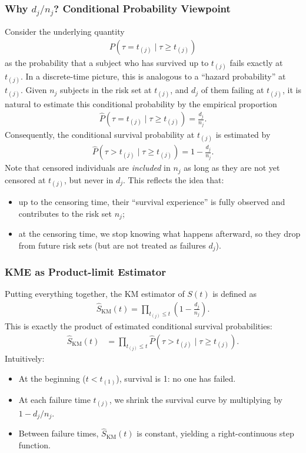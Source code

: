 \documentclass{article}
\theoremstyle{plain}
\theoremstyle{definition}
\theoremstyle{remark}
\begin{document}
\subsubsection{Why $d_j/n_j$? Conditional Probability Viewpoint}
Consider the underlying quantity
\begin{align}
    P(\tau = t_{(j)} \mid \tau \ge t_{(j)})
\end{align}
as the probability that a subject who has survived up to $t_{(j)}$ fails exactly at $t_{(j)}$. In a discrete-time picture, this is analogous to a ``hazard probability'' at $t_{(j)}$.
Given $n_j$ subjects in the risk set at $t_{(j)}$, and $d_j$ of them failing at $t_{(j)}$, it is natural to estimate this conditional probability by the empirical proportion
\begin{align}
    \hat{P}(\tau = t_{(j)} \mid \tau \ge t_{(j)})
    = \frac{d_j}{n_j}.
\end{align}
Consequently, the conditional survival probability at $t_{(j)}$ is estimated by
\begin{align}
\hat{P}(\tau > t_{(j)} \mid \tau \ge t_{(j)})
= 1 - \frac{d_j}{n_j}.
\end{align}
Note that censored individuals are \emph{included} in $n_j$ as long as they are not yet censored at $t_{(j)}$, but never in $d_j$. This reflects the idea that:
\begin{itemize}
    \item up to the censoring time, their ``survival experience'' is fully observed and contributes to the risk set $n_j$;
    \item at the censoring time, we stop knowing what happens afterward, so they drop from future risk sets (but are not treated as failures $d_j$).
\end{itemize}

\subsubsection{KME as Product-limit Estimator}
Putting everything together, the KM estimator of $S(t)$ is defined as
\begin{align}
\hat S_{\mathrm{KM}}(t)
= \prod_{t_{(j)} \le t} \left( 1 - \frac{d_j}{n_j} \right).
\label{eq:app_KME}
\end{align}
This is exactly the product of estimated conditional survival probabilities:
\begin{align}
\hat S_{\mathrm{KM}}(t)
&= \prod_{t_{(j)} \le t} 
\hat{P}(\tau>t_{(j)} \mid \tau \ge t_{(j)}).
\end{align}
Intuitively:
\begin{itemize}
\item At the beginning ($t< t_{(1)}$), survival is 1: no one has failed.
\item At each failure time $t_{(j)}$, we shrink the survival curve by multiplying by $1 - d_j / n_j$.
\item Between failure times, $\hat S_{\mathrm{KM}}(t)$ is constant, yielding a right-continuous step function.
\end{itemize}
\end{document}
